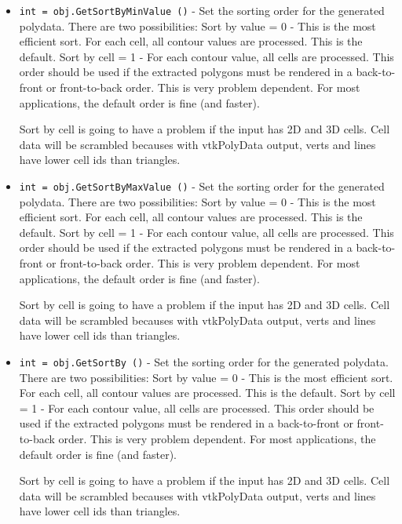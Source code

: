 \begin{itemize}
\item  \verb|int = obj.GetSortByMinValue ()| -  Set the sorting order for the generated polydata. There are two
 possibilities:
   Sort by value = 0 - This is the most efficient sort. For each cell,
      all contour values are processed. This is the default.
   Sort by cell = 1 - For each contour value, all cells are processed.
      This order should be used if the extracted polygons must be rendered
      in a back-to-front or front-to-back order. This is very problem 
      dependent.
 For most applications, the default order is fine (and faster).

 Sort by cell is going to have a problem if the input has 2D and 3D cells.
 Cell data will be scrambled becauses with 
 vtkPolyData output, verts and lines have lower cell ids than triangles.

\item  \verb|int = obj.GetSortByMaxValue ()| -  Set the sorting order for the generated polydata. There are two
 possibilities:
   Sort by value = 0 - This is the most efficient sort. For each cell,
      all contour values are processed. This is the default.
   Sort by cell = 1 - For each contour value, all cells are processed.
      This order should be used if the extracted polygons must be rendered
      in a back-to-front or front-to-back order. This is very problem 
      dependent.
 For most applications, the default order is fine (and faster).

 Sort by cell is going to have a problem if the input has 2D and 3D cells.
 Cell data will be scrambled becauses with 
 vtkPolyData output, verts and lines have lower cell ids than triangles.

\item  \verb|int = obj.GetSortBy ()| -  Set the sorting order for the generated polydata. There are two
 possibilities:
   Sort by value = 0 - This is the most efficient sort. For each cell,
      all contour values are processed. This is the default.
   Sort by cell = 1 - For each contour value, all cells are processed.
      This order should be used if the extracted polygons must be rendered
      in a back-to-front or front-to-back order. This is very problem 
      dependent.
 For most applications, the default order is fine (and faster).

 Sort by cell is going to have a problem if the input has 2D and 3D cells.
 Cell data will be scrambled becauses with 
 vtkPolyData output, verts and lines have lower cell ids than triangles.


\end{itemize}

